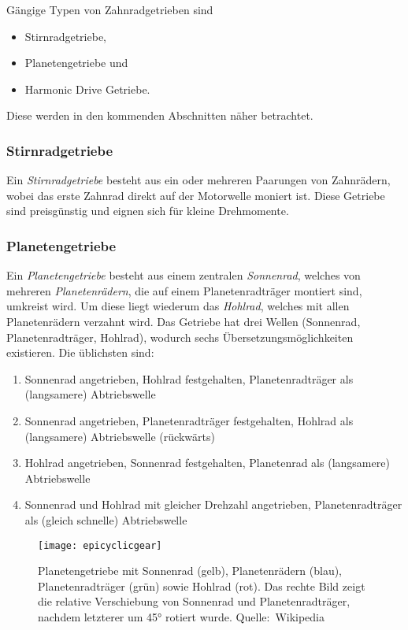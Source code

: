 			Gängige Typen von Zahnradgetrieben sind
			\begin{itemize}
				\item Stirnradgetriebe,
				\item Planetengetriebe und
				\item Harmonic Drive Getriebe.
			\end{itemize}
			Diese werden in den kommenden Abschnitten näher betrachtet.

			\subsubsection{Stirnradgetriebe}
				Ein \emph{Stirnradgetriebe} besteht aus ein oder mehreren Paarungen von Zahnrädern, wobei das erste Zahnrad direkt auf der Motorwelle moniert ist. Diese Getriebe sind preisgünstig und eignen sich für kleine Drehmomente.

			\subsubsection{Planetengetriebe}
				Ein \emph{Planetengetriebe} besteht aus einem zentralen \emph{Sonnenrad}, welches von mehreren \emph{Planetenrädern}, die auf einem Planetenradträger montiert sind, umkreist wird. Um diese liegt wiederum das \emph{Hohlrad}, welches mit allen Planetenrädern verzahnt wird. Das Getriebe hat drei Wellen (Sonnenrad, Planetenradträger, Hohlrad), wodurch sechs Übersetzungsmöglichkeiten existieren. Die üblichsten sind:
				\begin{enumerate}
					\item Sonnenrad angetrieben, Hohlrad festgehalten, Planetenradträger als (langsamere) Abtriebswelle
					\item Sonnenrad angetrieben, Planetenradträger festgehalten, Hohlrad als (langsamere) Abtriebswelle (rückwärts)
					\item Hohlrad angetrieben, Sonnenrad festgehalten, Planetenrad als (langsamere) Abtriebswelle
					\item Sonnenrad und Hohlrad mit gleicher Drehzahl angetrieben, Planetenradträger als (gleich schnelle) Abtriebswelle
				\end{enumerate}

				\begin{figure}
					\centering
					\texttt{[image: epicyclicgear]}
					\caption{Planetengetriebe mit Sonnenrad (gelb), Planetenrädern (blau), Planetenradträger (grün) sowie Hohlrad (rot). Das rechte Bild zeigt die relative Verschiebung von Sonnenrad und Planetenradträger, nachdem letzterer um \ang{45} rotiert wurde. Quelle:~Wikipedia}
				\end{figure}

